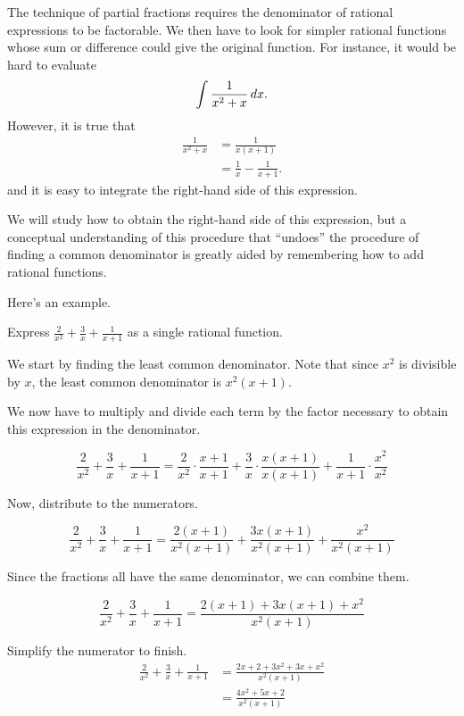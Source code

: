 \documentclass{ximera}
\author{Jim Talamo}
\begin{document}
\begin{exercise}


The technique of partial fractions requires the denominator of rational expressions to be factorable.
We then have to
look for simpler rational functions whose sum or difference could
give the original function.  For instance, it would be hard to
evaluate
\[
\int \frac{1}{x^2+x}\,d x.
\]
However, it is true that
\begin{align*}
\frac{1}{x^2+x} &= \frac{1}{x(x+1)}\\
&=\frac{1}{x}-\frac{1}{x+1}.
\end{align*}
and it is easy to integrate the right-hand side of this expression.

We will study how to obtain the right-hand side of this expression,
but a conceptual understanding of this procedure that ``undoes'' the
procedure of finding a common denominator is greatly aided by
remembering how to add rational functions.

Here's an example.

\begin{example}
Express $\frac{2}{x^2} + \frac{3}{x} + \frac{1}{x+1}$ as a single rational function.

\begin{explanation}
We start by finding the least common denominator.  Note that since $x^2$ is divisible by $x$, the least common denominator is $x^2(x+1)$.  

We now have to multiply and divide each term by the factor necessary to obtain this expression in the denominator.

\[
\frac{2}{x^2} + \frac{3}{x} + \frac{1}{x+1} = \frac{2}{x^2} \cdot \frac{x+1}{x+1}+ \frac{3}{x} \cdot \frac{x(x+1)}{x(x+1)} + \frac{1}{x+1}\cdot \frac{x^2}{x^2}
\]

Now, distribute to the numerators.

\[
\frac{2}{x^2} + \frac{3}{x} + \frac{1}{x+1} = \frac{2(x+1)}{x^2(x+1)} + \frac{3x(x+1)}{x^2(x+1)}  + \frac{x^2}{x^2(x+1)}
\]

Since the fractions all have the same denominator, we can combine them.

\[
\frac{2}{x^2} + \frac{3}{x} + \frac{1}{x+1} = \frac{2(x+1)+3x(x+1)+x^2}{x^2(x+1)}
\]

Simplify the numerator to finish.
\begin{align*}
\frac{2}{x^2} + \frac{3}{x} + \frac{1}{x+1} &= \frac{2x+2+3x^2+3x+x^2}{x^2(x+1)} \\
&= \frac{4x^2+5x+2}{x^2(x+1)}
\end{align*}


\end{explanation}
\end{example}
\end{exercise}
\end{document}
